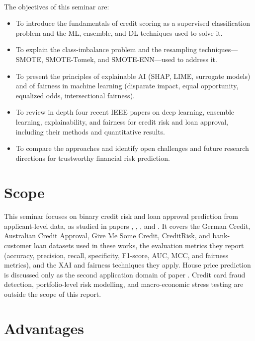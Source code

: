 \documentclass[12pt,a4paper,final]{extreport}
\begin{document}
\paragraph{} The objectives of this seminar are:
\begin{itemize}
  \item To introduce the fundamentals of credit scoring as a supervised classification problem and the ML, ensemble, and DL techniques used to solve it.
  \item To explain the class-imbalance problem and the resampling techniques---SMOTE, SMOTE-Tomek, and SMOTE-ENN---used to address it.
  \item To present the principles of explainable AI (SHAP, LIME, surrogate models) and of fairness in machine learning (disparate impact, equal opportunity, equalized odds, intersectional fairness).
  \item To review in depth four recent IEEE papers on deep learning, ensemble learning, explainability, and fairness for credit risk and loan approval, including their methods and quantitative results.
  \item To compare the approaches and identify open challenges and future research directions for trustworthy financial risk prediction.
\end{itemize}

\section{Scope}

\paragraph{} This seminar focuses on binary credit risk and loan approval prediction from applicant-level data, as studied in papers \cite{p1}, \cite{p2}, \cite{p3}, and \cite{p4}. It covers the German Credit, Australian Credit Approval, Give Me Some Credit, CreditRisk, and bank-customer loan datasets used in these works, the evaluation metrics they report (accuracy, precision, recall, specificity, F1-score, AUC, MCC, and fairness metrics), and the XAI and fairness techniques they apply. House price prediction is discussed only as the second application domain of paper \cite{p4}. Credit card fraud detection, portfolio-level risk modelling, and macro-economic stress testing are outside the scope of this report.

\section{Advantages}
\end{document}

